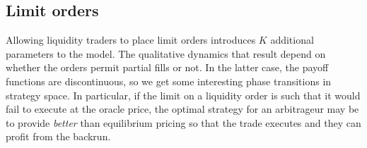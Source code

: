 \begin{comment}
\subsection{The free game as a decentralised limit}\label{decentralized-limit}

The free game models the situation where each agent has a strategy of
horizon of one slot. That is, for each player \(X\), given that \(X\) is
allocated at least one slot, \(X\) is almost surely allocated exactly
one slot. This approximates a limit of games whose allocation function
\(\phi\) is distributed as a product of uniform distributions as
\(N\rightarrow\infty\) (or at least whose point masses are
\(\mathcal{O}(N)\)).
\end{comment}

\subsection{Limit orders}

Allowing liquidity traders to place limit orders introduces $K$ additional parameters to the model.
%
The qualitative dynamics that result depend on whether the orders permit partial fills or not.
%
In the latter case, the payoff functions are discontinuous, so we get some interesting phase transitions in strategy space.
%
In particular, if the limit on a liquidity order is such that it would fail to execute at the oracle price, the optimal strategy for an arbitrageur may be to provide \emph{better} than equilibrium pricing so that the trade executes and they can profit from the backrun.

